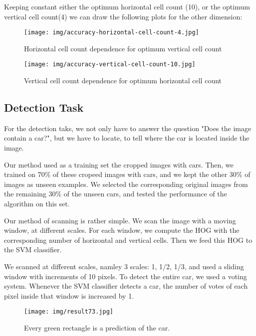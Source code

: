 Keeping constant either the optimum horizontal cell count (10), or the optimum vertical cell count(4) we can draw the following plots for the other dimension:


\begin{figure}[htb]
	\begin{center}
		\texttt{[image: img/accuracy-horizontal-cell-count-4.jpg]}
	    \caption{Horizontal cell count dependence for optimum vertical cell count \label{img:accuracy-horizontal-cell-count-4}}
    \end{center}
\end{figure}

\begin{figure}[htb]
	\begin{center}
		\texttt{[image: img/accuracy-vertical-cell-count-10.jpg]}
	    \caption{Vertical cell count dependence for optimum horizontal cell count \label{img:accuracy-vertical-cell-count-10}}
    \end{center}
\end{figure}

\subsection{Detection Task}

For the detection taks, we not only have to answer the question "Does the image contain a car?", but we have to locate, to tell where the car is located inside the image.

Our method used as a training set the cropped images with cars. Then, we trained on 70\% of these cropeed images with cars, and we kept the other 30\% of images as unseen examples. We selected the corresponding original images from the remaining 30\% of the unseen cars, and tested the performance of the algorithm on this set.

Our method of scanning is rather simple. We scan the image with a moving window, at different scales. For each window, we compute the HOG with the corresponding number of horizontal and vertical cells. Then we feed this HOG to the SVM classifier.

We scanned at different scales, namley 3 scales: 1, 1/2, 1/3, and used a sliding window with increments of 10 pixels. To detect the entire car, we used a voting system. Whenever the SVM classifier detects a car, the number of votes of each pixel inside that window is increased by 1.

\begin{figure}[htb]
	\begin{center}
		\texttt{[image: img/result73.jpg]}
	    \caption{Every green rectangle is a prediction of the car.\label{img:result73}}
    \end{center}
\end{figure}

